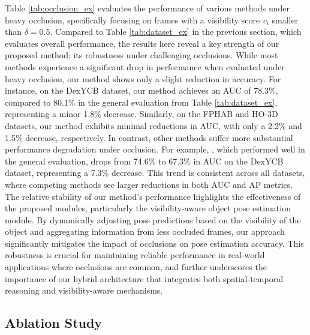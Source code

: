 Table \ref{tab:occlusion_ex} evaluates the performance of various methods under heavy occlusion, specifically focusing on frames with a visibility score \( v_i \) smaller than \( \delta = 0.5 \). Compared to Table \ref{tab:dataset_ex} in the previous section, which evaluates overall performance, the results here reveal a key strength of our proposed method: its robustness under challenging occlusions. While most methods experience a significant drop in performance when evaluated under heavy occlusion, our method shows only a slight reduction in accuracy. For instance, on the DexYCB dataset, our method achieves an AUC of 78.3\%, compared to 80.1\% in the general evaluation from Table \ref{tab:dataset_ex}, representing a minor 1.8\% decrease. Similarly, on the FPHAB and HO-3D datasets, our method exhibits minimal reductions in AUC, with only a 2.2\% and 1.5\% decrease, respectively. In contrast, other methods suffer more substantial performance degradation under occlusion. For example, \cite{wang2023deep}, which performed well in the general evaluation, drops from 74.6\% to 67.3\% in AUC on the DexYCB dataset, representing a 7.3\% decrease. This trend is consistent across all datasets, where competing methods see larger reductions in both AUC and AP metrics. The relative stability of our method's performance highlights the effectiveness of the proposed modules, particularly the visibility-aware object pose estimation module. By dynamically adjusting pose predictions based on the visibility of the object and aggregating information from less occluded frames, our approach significantly mitigates the impact of occlusions on pose estimation accuracy. This robustness is crucial for maintaining reliable performance in real-world applications where occlusions are common, and further underscores the importance of our hybrid architecture that integrates both spatial-temporal reasoning and visibility-aware mechanisms.

\subsection{Ablation Study}

